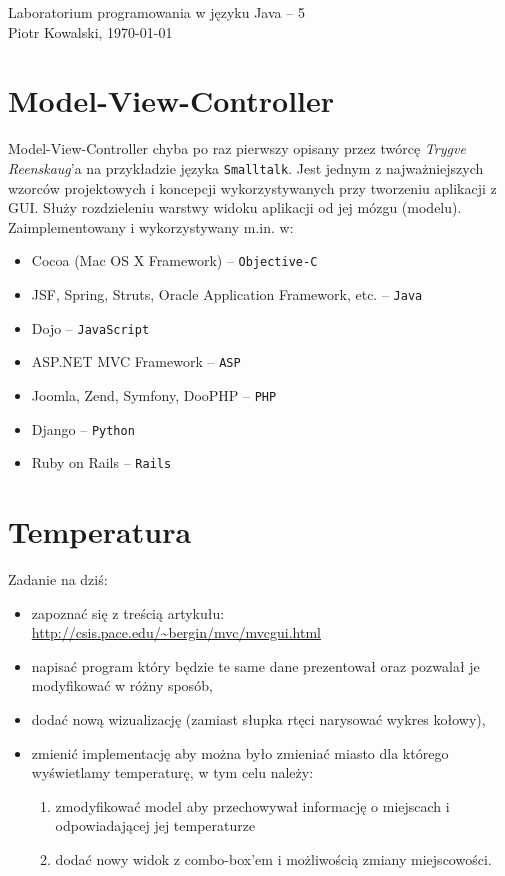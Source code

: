 \documentclass[12pt,letterpaper]{article}
\begin{document}
\linespread{1} %
\small \normalsize %
\begin{flushright}
  Laboratorium programowania w języku Java -- 5 
  \\
  Piotr Kowalski,
  \today
\end{flushright}

\section{Model-View-Controller}
\label{sec:mvc}

Model-View-Controller chyba po raz pierwszy opisany przez twórcę {\em
  Trygve Reenskaug}'a na przykładzie języka \verb+Smalltalk+. Jest jednym z
najważniejszych wzorców projektowych i koncepcji wykorzystywanych przy
tworzeniu aplikacji z GUI. Służy rozdzieleniu warstwy widoku aplikacji
od jej mózgu (modelu). Zaimplementowany i wykorzystywany m.in. w:
\begin{itemize}
\item Cocoa (Mac OS X Framework) -- \verb+Objective-C+
\item JSF, Spring, Struts, Oracle Application Framework, etc. -- \verb+Java+
\item Dojo -- \verb+JavaScript+
\item ASP.NET MVC Framework -- \verb+ASP+
\item Joomla, Zend, Symfony, DooPHP -- \verb+PHP+
\item Django -- \verb+Python+
\item Ruby on Rails -- \verb+Rails+
\end{itemize}

\section{Temperatura}
\label{sec:temperatura}

Zadanie na dziś:
\begin{itemize}
\item zapoznać się z treścią artykułu:
  \url{http://csis.pace.edu/~bergin/mvc/mvcgui.html}
\item napisać program który będzie te same dane prezentował oraz pozwalał je modyfikować w różny sposób,
\item dodać nową wizualizację (zamiast słupka rtęci narysować wykres kołowy),
\item zmienić implementację aby można było zmieniać miasto dla którego
  wyświetlamy temperaturę, w tym celu należy:
  \begin{enumerate}
  \item zmodyfikować model aby przechowywał informację o miejscach i
    odpowiadającej jej temperaturze
  \item dodać nowy widok z combo-box'em i możliwością zmiany miejscowości.
  \end{enumerate}

\end{itemize}
\end{document}
